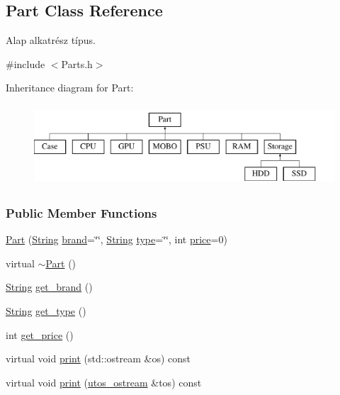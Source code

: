 \subsection{Part Class Reference}
\label{class_part}


Alap alkatrész típus.  




{\ttfamily \#include $<$Parts.\+h$>$}

Inheritance diagram for Part\+:\begin{figure}[H]
\begin{center}
\leavevmode
\includegraphics[height=3.000000cm]{class_part}
\end{center}
\end{figure}
\subsubsection*{Public Member Functions}
\begin{DoxyCompactItemize}
\item 
\mbox{\hyperlink{class_part_aae5224ee782134c4ecb60f23ec38698f}{Part}} (\mbox{\hyperlink{class_string}{String}} \mbox{\hyperlink{class_part_ae06f2fdeb7fbbdb229a7aca151f3e341}{brand}}=\char`\"{}\char`\"{}, \mbox{\hyperlink{class_string}{String}} \mbox{\hyperlink{class_part_a101dbcc5c4b21564df7414c7eb0eae88}{type}}=\char`\"{}\char`\"{}, int \mbox{\hyperlink{class_part_a8e71223aed1da95a974f33d8d6c91bb1}{price}}=0)
\item 
virtual \mbox{\hyperlink{class_part_aaecbb747a7227f7ce3b44caeaf1801c2}{$\sim$\+Part}} ()
\item 
\mbox{\hyperlink{class_string}{String}} \mbox{\hyperlink{class_part_abdaeb1db5ba55c184f39802c163e9ebc}{get\+\_\+brand}} ()
\item 
\mbox{\hyperlink{class_string}{String}} \mbox{\hyperlink{class_part_a97117fd470cd694ae0897fb2f4391786}{get\+\_\+type}} ()
\item 
int \mbox{\hyperlink{class_part_abb7c8371883825ad46773f219db3523e}{get\+\_\+price}} ()
\item 
virtual void \mbox{\hyperlink{class_part_a4fa402b8e8fd4236ff773a7697ab2bc3}{print}} (std\+::ostream \&os) const
\item 
virtual void \mbox{\hyperlink{class_part_a9ecabe44ba3415badf82c6a23617a41e}{print}} (\mbox{\hyperlink{structutos__ostream}{utos\+\_\+ostream}} \&tos) const
\end{DoxyCompactItemize}
